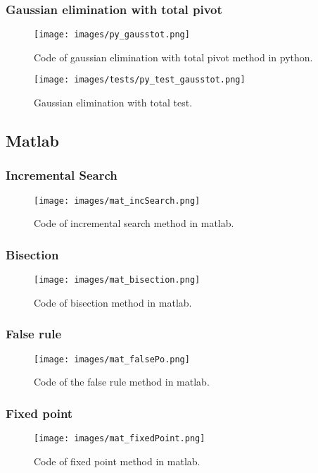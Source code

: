 \documentclass{article}
\begin{document}
\subsubsection{Gaussian elimination with total pivot}
\begin{figure}[ht]
\centering
\texttt{[image: images/py\_gausstot.png]}
\caption{\label{fig:py_gausstot}Code of gaussian elimination with total pivot method in python.}
\end{figure}
\FloatBarrier
\begin{figure}[ht]
\centering
\texttt{[image: images/tests/py\_test\_gausstot.png]}
\caption{\label{fig:py_gausstot}Gaussian elimination with total test.}
\end{figure}
\FloatBarrier

\subsection{Matlab}

\subsubsection{Incremental Search}
\begin{figure}[ht]
\centering
\texttt{[image: images/mat\_incSearch.png]}
\caption{\label{fig:py_gausstot}Code of incremental search method in matlab.}
\end{figure}
\FloatBarrier

\subsubsection{Bisection}
\begin{figure}[ht]
\centering
\texttt{[image: images/mat\_bisection.png]}
\caption{\label{fig:py_gausstot}Code of bisection method in matlab.}
\end{figure}
\FloatBarrier

\subsubsection{False rule}
\begin{figure}[ht]
\centering
\texttt{[image: images/mat\_falsePo.png]}
\caption{\label{fig:py_gausstot}Code of the false rule method in matlab.}
\end{figure}
\FloatBarrier

\subsubsection{Fixed point}
\begin{figure}[ht]
\centering
\texttt{[image: images/mat\_fixedPoint.png]}
\caption{\label{fig:py_gausstot}Code of fixed point method in matlab.}
\end{figure}
\FloatBarrier
\end{document}
